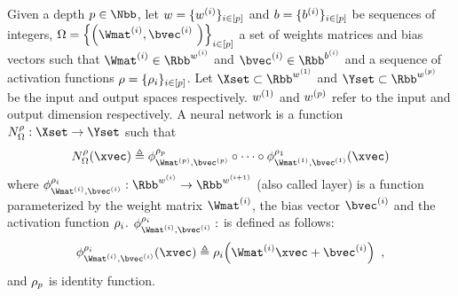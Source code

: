 \begin{definition} \label{definition:ch2-neural_networks}
  Given a depth $\depth \in \Nbb$, 
  let $w = \{ w^{(i)} \}_{i \in [p]}$ and $b = \{ b^{(i)} \}_{i \in [p]}$ be sequences of integers, $\weights = \left\{ \left( \Wmat^{(i)}, \bvec^{(i)} \right) \right\}_{i \in [\depth]}$ a set of weights matrices and bias vectors 
  such that $\Wmat^{(i)} \in \Rbb^{\dimw^{(i)}}$ and $\bvec^{(i)} \in \Rbb^{\dimb^{(i)}}$ and a sequence of activation functions $\rho = \{\rho_i \}_{i \in [p]}$.
  Let $\Xset \subset \Rbb^{\dimw^{(1)}}$ and $\Yset \subset \Rbb^{\dimw^{(\depth)}}$ be the input and output spaces respectively. 
	$w^{(1)}$ and $w^{(p)}$ refer to the input and output dimension respectively.
  A neural network is a function $\nn^\act_\weights : \Xset \rightarrow \Yset$ such that
  \begin{equation}
    \nn^\act_{\weights}(\xvec) \triangleq \layer^{\act_\depth}_{\Wmat^{(\depth)}, \bvec^{(\depth)}} \circ \cdots \circ \layer^{\act_1}_{\Wmat^{(1)}, \bvec^{(1)}}(\xvec)
  \end{equation}
  where $\layer^{\act_i}_{\Wmat^{(i)},\bvec^{(i)}}: \Rbb^{w^{(i)}} \rightarrow \Rbb^{w^{(i+1)}}$ (also called layer) is a function parameterized by the weight matrix $\Wmat^{(i)}$, the bias vector $\bvec^{(i)}$ and the activation function $\rho_i$.
  $\layer^{\act_i}_{\Wmat^{(i)},\bvec^{(i)}}:$  is defined as follows: 
  \begin{equation}
    \layer^{\act_i}_{\Wmat^{(i)},\bvec^{(i)}} (\xvec) \triangleq \act_i \left(\Wmat^{(i)}\xvec + \bvec^{(i)}\right) \enspace,
  \end{equation}
  and $\rho_p$ is identity function.
\end{definition}

